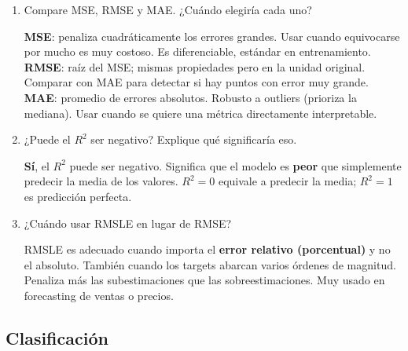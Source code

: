\documentclass[11pt,a4paper]{article}
\begin{document}
\begin{enumerate}[label=\textbf{P\arabic*.}, resume]

\item Compare MSE, RMSE y MAE. ¿Cu\'ando elegir\'ia cada uno?

\begin{answerbox}
\textbf{MSE}: penaliza cuadr\'aticamente los errores grandes. Usar cuando equivocarse
por mucho es muy costoso. Es diferenciable, est\'andar en entrenamiento.\\
\textbf{RMSE}: ra\'iz del MSE; mismas propiedades pero en la unidad original.
Comparar con MAE para detectar si hay puntos con error muy grande.\\
\textbf{MAE}: promedio de errores absolutos. Robusto a outliers (prioriza la mediana).
Usar cuando se quiere una m\'etrica directamente interpretable.
\end{answerbox}

\item ¿Puede el $R^2$ ser negativo? Explique qu\'e significar\'ia eso.

\begin{answerbox}
\textbf{S\'i}, el $R^2$ puede ser negativo. Significa que el modelo es \textbf{peor}
que simplemente predecir la media de los valores. $R^2 = 0$ equivale a predecir la
media; $R^2 = 1$ es predicci\'on perfecta.
\end{answerbox}

\item ¿Cu\'ando usar RMSLE en lugar de RMSE?

\begin{answerbox}
RMSLE es adecuado cuando importa el \textbf{error relativo (porcentual)} y no el absoluto.
Tambi\'en cuando los targets abarcan varios \'ordenes de magnitud. Penaliza m\'as las
subestimaciones que las sobreestimaciones. Muy usado en forecasting de ventas o precios.
\end{answerbox}

\end{enumerate}

\subsection{Clasificaci\'on}
\end{document}
